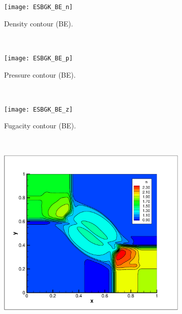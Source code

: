 \documentclass{rsproca}%
\begin{document}
\begin{figure}
        \centering
        \begin{subfigure}[b]{0.32\textwidth}
                \centering
                \texttt{[image: ESBGK\_BE\_n]}
                \caption{Density contour (BE).}
                \label{fig:5ESBGK_BE_n}
        \end{subfigure}%
        ~ %
        \begin{subfigure}[b]{0.32\textwidth}
                \centering
                \texttt{[image: ESBGK\_BE\_p]}
                \caption{Pressure contour (BE).}
                \label{fig:5ESBGK_BE_p}
        \end{subfigure}
        ~ %
        \begin{subfigure}[b]{0.32\textwidth}
                \centering
                \texttt{[image: ESBGK\_BE\_z]}
                \caption{Fugacity contour (BE).}
                \label{fig:5ESBGK_BE_z}
        \end{subfigure}
				~ %
        \begin{subfigure}[b]{0.32\textwidth}
                \centering
                \includegraphics[trim = 20mm 15mm 20mm 20mm,clip,width=\textwidth]{ESBGK_MB_n}

\end{subfigure}
\end{figure}
\end{document}

